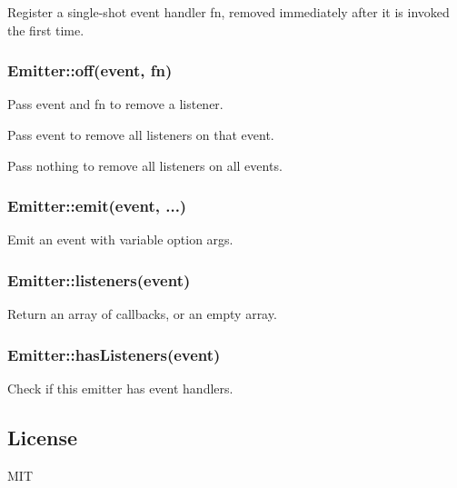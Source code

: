 Register a single-\/shot {\ttfamily event} handler {\ttfamily fn}, removed immediately after it is invoked the first time.

\subsubsection*{Emitter\+::off(event, fn)}


\begin{DoxyItemize}
\item Pass {\ttfamily event} and {\ttfamily fn} to remove a listener.
\item Pass {\ttfamily event} to remove all listeners on that event.
\item Pass nothing to remove all listeners on all events.
\end{DoxyItemize}

\subsubsection*{Emitter\+::emit(event, ...)}

Emit an {\ttfamily event} with variable option args.

\subsubsection*{Emitter\+::listeners(event)}

Return an array of callbacks, or an empty array.

\subsubsection*{Emitter\+::has\+Listeners(event)}

Check if this emitter has {\ttfamily event} handlers.

\subsection*{License}

M\+IT 